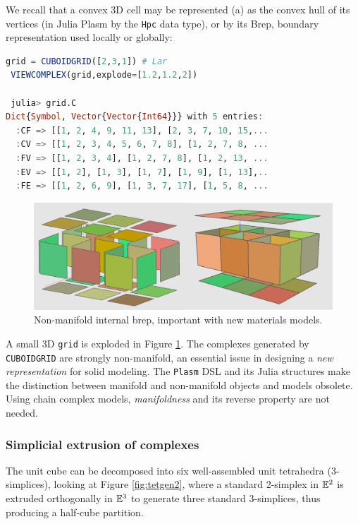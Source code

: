 \documentclass{juliacon}
\begin{document}
We recall that a convex 3D cell may be represented (a) as the convex hull of its vertices (in Julia Plasm by the {\tt Hpc} data type), or by its Brep, boundary representation used locally or globally:
\begin{lstlisting}[language = Julia,numbers=none,label={lst:exmpl8},
caption={Direct gereration of any-dimensional cuboidal complex.}
]
 grid = CUBOIDGRID([2,3,1]) # Lar
 VIEWCOMPLEX(grid,explode=[1.2,1.2,2])
 
 julia> grid.C
Dict{Symbol, Vector{Vector{Int64}}} with 5 entries:
  :CF => [[1, 2, 4, 9, 11, 13], [2, 3, 7, 10, 15,...
  :CV => [[1, 2, 3, 4, 5, 6, 7, 8], [1, 2, 7, 8, ...
  :FV => [[1, 2, 3, 4], [1, 2, 7, 8], [1, 2, 13, ...
  :EV => [[1, 2], [1, 3], [1, 7], [1, 9], [1, 13],..
  :FE => [[1, 2, 6, 9], [1, 3, 7, 17], [1, 5, 8, ...
\end{lstlisting}
	\begin{figure}[htbp]  \centering
		\includegraphics[width=0.75\linewidth]{figs/grid}
		\caption{Non-manifold internal brep, important with new materials models.}
		\label{grid}
	\end{figure}
	A small 3D {\tt grid} is exploded in Figure \ref{grid}. The complexes generated by {\tt CUBOIDGRID} are strongly non-manifold, an essential issue in designing a \emph{new representation} for solid modeling.
	The \texttt{Plasm} DSL and its Julia structures make the distinction between manifold and non-manifold objects and models obsolete. Using chain complex models, \emph{manifoldness} and its reverse property are not needed.


\subsubsection*{Simplicial extrusion of complexes}\label{rem:sixtetra}
The unit cube can be decomposed into six well-assembled unit tetrahedra (3-simplices), looking at Figure \ref{fig:tetgen2}, where a standard 2-simplex in $\mathbb{E}^2$ is extruded orthogonally in $\mathbb{E}^3$ to generate three standard 3-simplices, thus producing a half-cube partition. 
	
\end{document}
